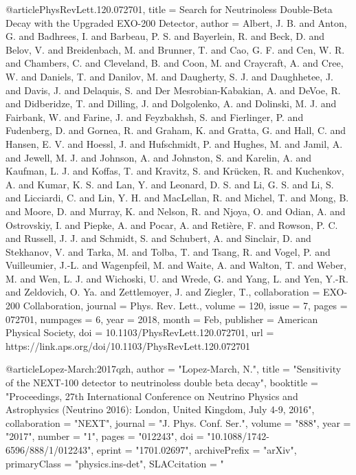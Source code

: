 {{{{{{{{{{{@article{PhysRevLett.120.072701,
title = {Search for Neutrinoless Double-Beta Decay with the Upgraded {EXO}-200 Detector},
author = {Albert, J. B. and Anton, G. and Badhrees, I. and Barbeau, P. S. and Bayerlein, R. and Beck, D. and Belov, V. and Breidenbach, M. and Brunner, T. and Cao, G. F. and Cen, W. R. and Chambers, C. and Cleveland, B. and Coon, M. and Craycraft, A. and Cree, W. and Daniels, T. and Danilov, M. and Daugherty, S. J. and Daughhetee, J. and Davis, J. and Delaquis, S. and Der Mesrobian-Kabakian, A. and DeVoe, R. and Didberidze, T. and Dilling, J. and Dolgolenko, A. and Dolinski, M. J. and Fairbank, W. and Farine, J. and Feyzbakhsh, S. and Fierlinger, P. and Fudenberg, D. and Gornea, R. and Graham, K. and Gratta, G. and Hall, C. and Hansen, E. V. and Hoessl, J. and Hufschmidt, P. and Hughes, M. and Jamil, A. and Jewell, M. J. and Johnson, A. and Johnston, S. and Karelin, A. and Kaufman, L. J. and Koffas, T. and Kravitz, S. and Kr\"ucken, R. and Kuchenkov, A. and Kumar, K. S. and Lan, Y. and Leonard, D. S. and Li, G. S. and Li, S. and Licciardi, C. and Lin, Y. H. and MacLellan, R. and Michel, T. and Mong, B. and Moore, D. and Murray, K. and Nelson, R. and Njoya, O. and Odian, A. and Ostrovskiy, I. and Piepke, A. and Pocar, A. and Reti\`ere, F. and Rowson, P. C. and Russell, J. J. and Schmidt, S. and Schubert, A. and Sinclair, D. and Stekhanov, V. and Tarka, M. and Tolba, T. and Tsang, R. and Vogel, P. and Vuilleumier, J.-L. and Wagenpfeil, M. and Waite, A. and Walton, T. and Weber, M. and Wen, L. J. and Wichoski, U. and Wrede, G. and Yang, L. and Yen, Y.-R. and Zeldovich, O. Ya. and Zettlemoyer, J. and Ziegler, T.},
collaboration = {EXO-200 Collaboration},
journal = {Phys. Rev. Lett.},
volume = {120},
issue = {7},
pages = {072701},
numpages = {6},
year = {2018},
month = {Feb},
publisher = {American Physical Society},
doi = {10.1103/PhysRevLett.120.072701},
url = {https://link.aps.org/doi/10.1103/PhysRevLett.120.072701}
}

@article{Lopez-March:2017qzh,
      author         = "Lopez-March, N.",
      title          = "{Sensitivity of the NEXT-100 detector to neutrinoless
                        double beta decay}",
      booktitle      = "{Proceedings, 27th International Conference on Neutrino
                        Physics and Astrophysics (Neutrino 2016): London, United
                        Kingdom, July 4-9, 2016}",
      collaboration  = "NEXT",
      journal        = "J. Phys. Conf. Ser.",
      volume         = "888",
      year           = "2017",
      number         = "1",
      pages          = "012243",
      doi            = "10.1088/1742-6596/888/1/012243",
      eprint         = "1701.02697",
      archivePrefix  = "arXiv",
      primaryClass   = "physics.ins-det",
      SLACcitation   = "%
}

}}}}}}}}}}}
